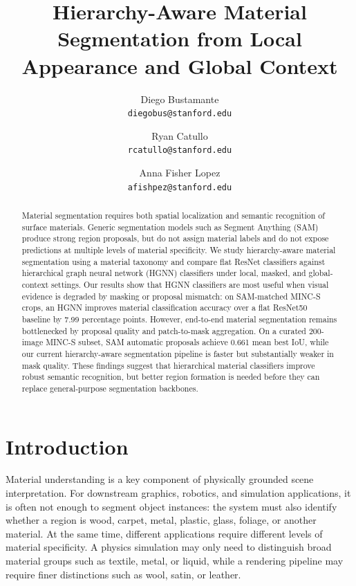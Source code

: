 \documentclass[11pt,twocolumn,letterpaper]{article}
\begin{document}
\title{Hierarchy-Aware Material Segmentation from Local Appearance and Global Context}

\author{Diego Bustamante\\
{\tt diegobus@stanford.edu}
\and
Ryan Catullo\\
\texttt{rcatullo@stanford.edu}
\and
Anna Fisher Lopez\\
\texttt{afishpez@stanford.edu}
}

\maketitle

\begin{abstract}
Material segmentation requires both spatial localization and semantic recognition of surface materials. Generic segmentation models such as Segment Anything (SAM) produce strong region proposals, but do not assign material labels and do not expose predictions at multiple levels of material specificity. We study hierarchy-aware material segmentation using a material taxonomy and compare flat ResNet classifiers against hierarchical graph neural network (HGNN) classifiers under local, masked, and global-context settings. Our results show that HGNN classifiers are most useful when visual evidence is degraded by masking or proposal mismatch: on SAM-matched MINC-S crops, an HGNN improves material classification accuracy over a flat ResNet50 baseline by 7.99 percentage points. However, end-to-end material segmentation remains bottlenecked by proposal quality and patch-to-mask aggregation. On a curated 200-image MINC-S subset, SAM automatic proposals achieve 0.661 mean best IoU, while our current hierarchy-aware segmentation pipeline is faster but substantially weaker in mask quality. These findings suggest that hierarchical material classifiers improve robust semantic recognition, but better region formation is needed before they can replace general-purpose segmentation backbones.
\end{abstract}

\section{Introduction}

Material understanding is a key component of physically grounded scene interpretation. For downstream graphics, robotics, and simulation applications, it is often not enough to segment object instances: the system must also identify whether a region is wood, carpet, metal, plastic, glass, foliage, or another material. At the same time, different applications require different levels of material specificity. A physics simulation may only need to distinguish broad material groups such as textile, metal, or liquid, while a rendering pipeline may require finer distinctions such as wool, satin, or leather.
\end{document}
